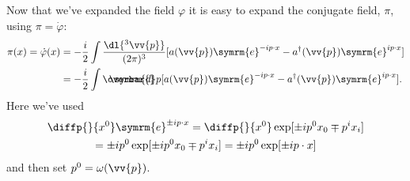 \documentclass[fleqn]{NotesClass}
\newcommand{\e}{\symrm{e}}
\newcommand{\hermit}{{\dagger}}
\newcommand{\dbar}[1][0.0]{\ThisStyle{\ensurestackMath{%
            \stackengine{#1\LMex}{\SavedStyle \symrm{d}}{\SavedStyle\overbar{}%
                \mkern2.25mu}{O}{r}{F}{F}{L}}}}
\newcommand{\invariantmeasure}[1]{%
    \mathchoice{\dbar #1}{\dbar #1}{\dbar[.05] #1}{\dbar[.06] #1}
}
\begin{document}
    Now that we've expanded the field \(\varphi\) it is easy to expand the conjugate field, \(\pi\), using \(\pi = \dot{\varphi}\):
    \begin{align}
        \pi(x) = \dot{\varphi}(x) &= -\frac{i}{2} \int \frac{\dl{^3\vv{p}}}{(2\pi)^3} [a(\vv{p}) \e^{-ip\cdot x} - a^\hermit(\vv{p}) \e^{ip \cdot x}]\\
        &= -\frac{i}{2} \int \invariantmeasure{p} [a(\vv{p}) \e^{-ip\cdot x} - a^\hermit(\vv{p}) \e^{ip \cdot x}].
    \end{align}
    Here we've used
    \begin{multline}
        \diffp{}{x^0} \e^{\pm ip \cdot x} = \diffp{}{x^0} \exp[\pm ip^0x_0 \mp p^ix_i]\\
        = \pm ip^0 \exp[\pm ip^0x_0 \mp p^ix_i] = \pm i p^0 \exp[\pm ip \cdot x]
    \end{multline}
    and then set \(p^0 = \omega(\vv{p})\).
    
\end{document}
